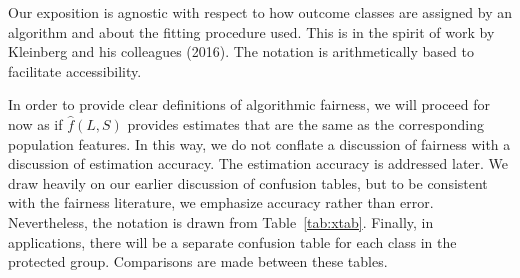 \documentclass[12pt]{article}
\begin{document}
Our exposition is agnostic with respect to how outcome classes are assigned by an algorithm and about the fitting procedure used. This is in the spirit of work by Kleinberg and his colleagues (2016). The notation is arithmetically based to facilitate accessibility. 
 
In order to provide clear definitions of algorithmic fairness, we will proceed for now as if $\hat{f}(L,S)$ provides estimates that are the same as the corresponding population features. In this way, we do not conflate a discussion of fairness with a discussion of estimation accuracy. The estimation accuracy is addressed later. We draw heavily on our earlier discussion of confusion tables, but to be consistent with the fairness literature, we emphasize accuracy rather than error. Nevertheless, the notation is drawn from Table~\ref{tab:xtab}. Finally, in applications, there will be a separate confusion table for each class in the protected group. Comparisons are made between these tables. 
\end{document}
